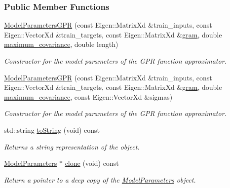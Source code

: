 \subsubsection*{Public Member Functions}
\begin{DoxyCompactItemize}
\item 
\hyperlink{classDmpBbo_1_1ModelParametersGPR_a86bc19c8639d6a338726668c9d833278}{Model\+Parameters\+G\+P\+R} (const Eigen\+::\+Matrix\+Xd \&train\+\_\+inputs, const Eigen\+::\+Vector\+Xd \&train\+\_\+targets, const Eigen\+::\+Matrix\+Xd \&\hyperlink{classDmpBbo_1_1ModelParametersGPR_a9020e3c52d3e8b18d8d3caf675ae409e}{gram}, double \hyperlink{classDmpBbo_1_1ModelParametersGPR_a298a9f1cca5f13135bb2b4334a56c734}{maximum\+\_\+covariance}, double length)
\begin{DoxyCompactList}\small\item\em Constructor for the model parameters of the G\+P\+R function approximator. \end{DoxyCompactList}\item 
\hyperlink{classDmpBbo_1_1ModelParametersGPR_a4c282bb545b3d48bb4b9d095d627c7fc}{Model\+Parameters\+G\+P\+R} (const Eigen\+::\+Matrix\+Xd \&train\+\_\+inputs, const Eigen\+::\+Vector\+Xd \&train\+\_\+targets, const Eigen\+::\+Matrix\+Xd \&\hyperlink{classDmpBbo_1_1ModelParametersGPR_a9020e3c52d3e8b18d8d3caf675ae409e}{gram}, double \hyperlink{classDmpBbo_1_1ModelParametersGPR_a298a9f1cca5f13135bb2b4334a56c734}{maximum\+\_\+covariance}, const Eigen\+::\+Vector\+Xd \&sigmas)
\begin{DoxyCompactList}\small\item\em Constructor for the model parameters of the G\+P\+R function approximator. \end{DoxyCompactList}\item 
std\+::string \hyperlink{classDmpBbo_1_1ModelParametersGPR_a1aca816b42cf0d36118be0ab91120d77}{to\+String} (void) const 
\begin{DoxyCompactList}\small\item\em Returns a string representation of the object. \end{DoxyCompactList}\item 
\hyperlink{classDmpBbo_1_1ModelParameters}{Model\+Parameters} $\ast$ \hyperlink{classDmpBbo_1_1ModelParametersGPR_a0a71d403a2e0560e058c03394648d773}{clone} (void) const 
\begin{DoxyCompactList}\small\item\em Return a pointer to a deep copy of the \hyperlink{classDmpBbo_1_1ModelParameters}{Model\+Parameters} object. \end{DoxyCompactList}\item 

\end{DoxyCompactItemize}
